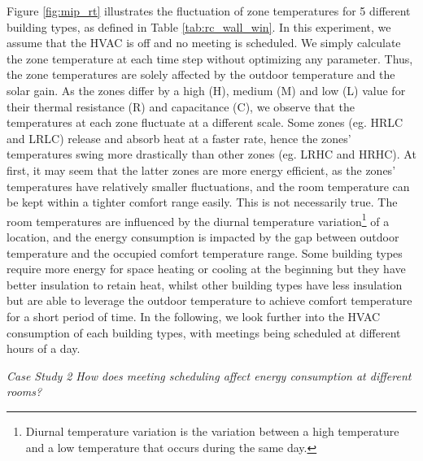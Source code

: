 Figure \ref{fig:mip_rt} illustrates the fluctuation of zone temperatures for 5 different building types, as defined in Table \ref{tab:rc_wall_win}. In this experiment, we assume that the HVAC is off and no meeting is scheduled. We simply calculate the zone temperature at each time step without optimizing any parameter. Thus, the zone temperatures are solely affected by the outdoor temperature and the solar gain. As the zones differ by a high (H), medium (M) and low (L) value for their thermal resistance (R) and capacitance (C), we observe that the temperatures at each zone fluctuate at a different scale. Some zones (eg. HRLC and LRLC) release and absorb heat at a faster rate, hence the zones' temperatures swing more drastically than other zones (eg. LRHC and HRHC). %
At first, it may seem that the latter zones are more energy efficient, as the zones' temperatures have relatively smaller fluctuations, and the room temperature can be kept within a tighter comfort range easily.
This is not necessarily true. The room temperatures are influenced by the diurnal temperature variation\footnote{Diurnal temperature variation is the variation between a high temperature and a low temperature that occurs during the same day.} of a location, and the energy consumption is impacted by the gap between outdoor temperature and the occupied comfort temperature range. Some building types require more energy for space heating or cooling at the beginning but they have better insulation to retain heat, whilst other building types have less insulation but are able to leverage the outdoor temperature to achieve comfort temperature for a short period of time. %
In the following, we look further into the HVAC consumption of each building types, with meetings being scheduled at different hours of a day.

\vspace{10px}
\emph{Case Study 2} \quad \textsl{How does meeting scheduling affect energy consumption at different rooms?}
\vspace{10px}

